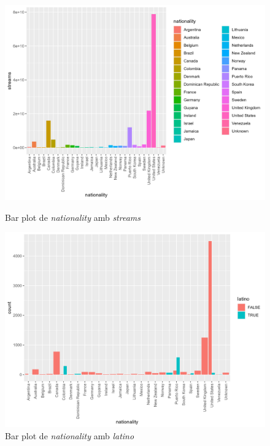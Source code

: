 \begin{figure}[H]
\centering
    \begin{minipage}{.4\textwidth}
        \centering
        \includegraphics[width=0.95\linewidth]{Images/3_Preprocessing/nationalitystreams.png}
        \caption{Bar plot de \textit{nationality} amb \textit{streams}}
        \label{fig:BivariateP_nationstreams}
    \end{minipage}%
    \begin{minipage}{.4\textwidth}
        \centering
        \includegraphics[width=0.95\linewidth]{Images/3_Preprocessing/nationalitylatino.png}
        \caption{Bar plot de \textit{nationality} amb \textit{latino}}
        \label{fig:BivariateP_nationlati}
    \end{minipage}%
\end{figure}

